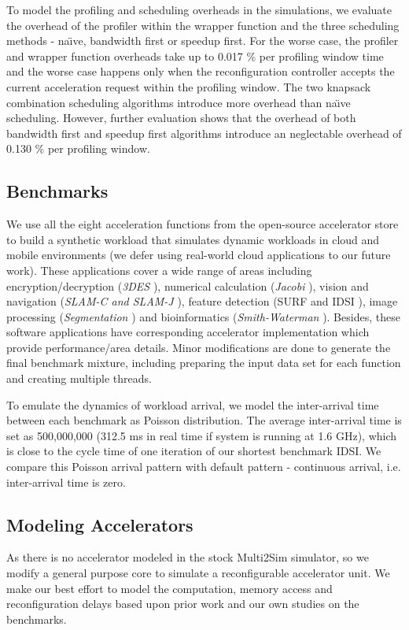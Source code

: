 To model the profiling and scheduling overheads in the simulations,
we evaluate the overhead of the profiler within the wrapper function and the
three scheduling methods - na\"{\i}ve, bandwidth first or speedup first. For
the worse case, the profiler and wrapper function overheads take up
to 0.017 \% per profiling window time and the worse case happens only
when the reconfiguration controller accepts the current acceleration
request within the profiling window. The two knapsack combination
scheduling algorithms introduce more overhead than na\"{\i}ve scheduling. However, further evaluation shows that the overhead of both bandwidth
first and speedup first algorithms introduce an neglectable overhead of 0.130 \% per profiling window. 

\subsection{Benchmarks}
We use all the eight acceleration functions from the
open-source accelerator store \cite{accstore} to build a synthetic
workload that simulates dynamic workloads in cloud and mobile
environments (we defer using real-world cloud applications to our
future work).  These applications cover a wide range of areas
including encryption/decryption ({\em 3DES} \cite{openssl}), numerical
calculation ({\em Jacobi} \cite{jacobi-wiki}), vision and navigation
({\em SLAM-C and SLAM-J} \cite{openslam}), feature detection (SURF and
IDSI \cite{opencv}), image processing ({\em Segmentation}
\cite{segmentation-wiki}) and bioinformatics ({\em Smith-Waterman}
\cite{smithwaterman-wiki}). Besides, these software applications have
corresponding accelerator implementation which provide
performance/area details. Minor modifications are done to generate the
final benchmark mixture, including preparing the input data set for
each function and creating multiple threads.

To emulate the dynamics of workload arrival, we model the inter-arrival time between
each benchmark as Poisson distribution. The average
inter-arrival time is set as 500,000,000 (312.5 ms
in real time if system is running at 1.6 GHz), which is close to the
cycle time of one iteration of our shortest benchmark IDSI. We compare
this Poisson arrival pattern with default pattern - continuous
arrival, i.e. inter-arrival time is zero.

\subsection{Modeling Accelerators}
As there is no accelerator modeled in the stock Multi2Sim simulator,
so we modify a general purpose core to simulate a reconfigurable
accelerator unit. We make our best effort to model the
computation, memory access and reconfiguration delays  based
upon prior work and our own studies on the benchmarks. 

